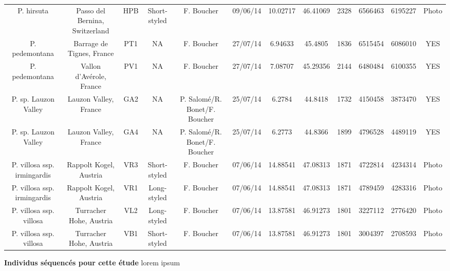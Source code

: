 \documentclass[12pt,a4paper,notitlepage]{article}
\begin{document}
\begin{landscape}
\begin{annexe}
{\begin{tabular}{cccccccccccc}
P. hirsuta &Passo del Bernina, Switzerland &HPB &Short-styled &F. Boucher &09/06/14 & 10.02717 & 46.41069 &2328&6566463&6195227&Photo \\
P. pedemontana &Barrage de Tignes, France &PT1 & NA &F. Boucher &27/07/14 & 6.94633 & 45.4805 &1836&6515454&6086010&YES \\
P. pedemontana &Vallon d'Avérole, France &PV1 & NA &F. Boucher &27/07/14 & 7.08707 & 45.29356 &2144&6480484&6100355&YES \\
P. sp. Lauzon Valley &Lauzon Valley, France &GA2 & NA &P. Salomé/R. Bonet/F. Boucher &25/07/14 & 6.2784 & 44.8418 &1732&4150458&3873470&YES \\
P. sp. Lauzon Valley &Lauzon Valley, France &GA4 & NA &P. Salomé/R. Bonet/F. Boucher &25/07/14 & 6.2773 & 44.8366 &1899&4796528&4489119&YES \\
P. villosa ssp. irmingardis &Rappolt Kogel, Austria &VR3 &Short-styled &F. Boucher &07/06/14 & 14.88541 & 47.08313 &1871&4722814&4234314&Photo \\
P. villosa ssp. irmingardis &Rappolt Kogel, Austria &VR1 &Long-styled &F. Boucher &07/06/14 & 14.88541 & 47.08313 &1871&4789459&4283316&Photo \\
P. villosa ssp. villosa &Turracher Hohe, Austria &VL2 &Long-styled &F. Boucher &07/06/14 & 13.87581 & 46.91273 &1801&3227112&2776420&Photo \\
P. villosa ssp. villosa &Turracher Hohe, Austria &VB1 &Short-styled &F. Boucher &07/06/14 & 13.87581 & 46.91273 &1801&3004397&2708593&Photo \\
	\bottomrule
	\end{tabular}}
	\caption{\textbf{Individus séquencés pour cette étude} lorem ipsum}
	\label{table_ind}
\end{annexe}
\end{landscape}

\end{document}

